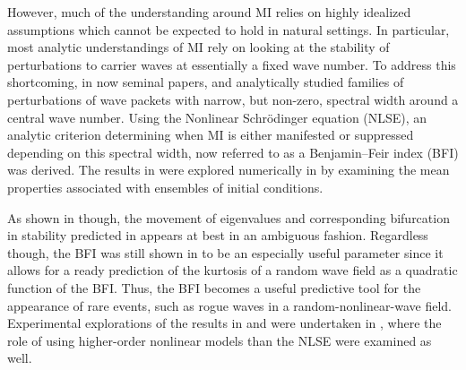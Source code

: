 \documentclass[a4paper,11pt]{article}
\begin{document}
However, much of the understanding around MI relies on highly idealized assumptions which cannot be expected to hold in natural settings.  In particular, most analytic understandings of MI rely on looking at the stability of perturbations to carrier waves at essentially a fixed wave number.  To address this shortcoming, in now seminal papers, \cite{alber} and \cite{alber2} analytically studied families of perturbations of wave packets with narrow, but non-zero, spectral width around a central wave number.  Using the Nonlinear Schr\"{o}dinger equation (NLSE), an analytic criterion determining when MI is either manifested or suppressed depending on this spectral width, now referred to as a Benjamin--Feir index (BFI) was derived.  The results in \cite{alber} were explored numerically in \cite{dysthe2,dysthe3} by examining the mean properties associated with ensembles of initial conditions.  

As shown in \cite{janssen} though, the movement of eigenvalues and corresponding bifurcation in stability predicted in \cite{alber} appears at best in an ambiguous fashion.  Regardless though, the BFI was still shown in \cite{janssen} to be an especially useful parameter since it allows for a ready prediction of the kurtosis of a random wave field as a quadratic function of the BFI.  Thus, the BFI becomes a useful predictive tool for the appearance of rare events, such as rogue waves in a random-nonlinear-wave field.  Experimental explorations of the results in \cite{janssen} and \cite{alber} were undertaken in \cite{onorato}, where the role of using higher-order nonlinear models than the NLSE were examined as well.  
\end{document}
